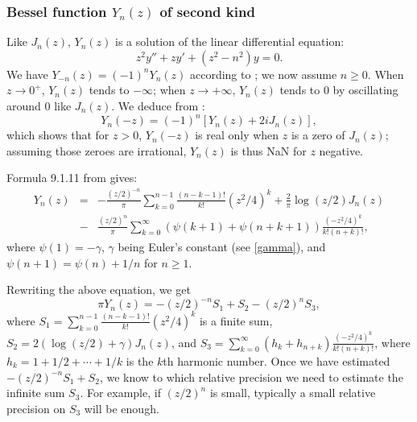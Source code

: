 \documentclass[12pt]{amsart}
\begin{document}
\subsubsection{Bessel function $Y_n(z)$ of second kind}

Like $J_n(z)$, $Y_n(z)$ is a solution of the linear differential equation:
\[ z^2 y'' + z y' + (z^2-n^2) y = 0. \]
We have $Y_{-n}(z) = (-1)^n Y_n(z)$ according to \cite[Eq.~(9.1.5)]{AbSt73};
we now assume $n \geq 0$.
When $z \rightarrow 0^+$, $Y_n(z)$ tends to $-\infty$; when $z \rightarrow
+\infty$, $Y_n(z)$ tends to $0$ by oscillating around $0$ like $J_n(z)$.
We deduce from \cite[Eq.~(9.23)]{Temme96}:
\[ Y_n(-z) = (-1)^n [Y_n(z) + 2 i J_n(z)], \]
which shows that for $z > 0$, $Y_n(-z)$ is real only when $z$ is a zero of
$J_n(z)$; assuming those zeroes are irrational, $Y_n(z)$ is thus NaN for
$z$ negative.

Formula 9.1.11 from \cite{AbSt73} gives:
\begin{eqnarray*}
Y_n(z) &=& -\frac{(z/2)^{-n}}{\pi} \sum_{k=0}^{n-1} \frac{(n-k-1)!}{k!}
   (z^2/4)^k + \frac{2}{\pi} \log(z/2) J_n(z) \\ &-& \frac{(z/2)^n}{\pi}
  \sum_{k=0}^{\infty} (\psi(k+1) + \psi(n+k+1)) \frac{(-z^2/4)^k}{k! (n+k)!},
\end{eqnarray*}
where $\psi(1)=-\gamma$, $\gamma$ being Euler's constant (see
\textsection\ref{gamma}), and $\psi(n+1) = \psi(n) + 1/n$ for $n \geq 1$.

Rewriting the above equation, we get
\[ \pi Y_n(z) = -(z/2)^{-n} S_1 + S_2 - (z/2)^n S_3, \]
where $S_1 = \sum_{k=0}^{n-1} \frac{(n-k-1)!}{k!} (z^2/4)^k$ is
a finite sum,
$S_2 = 2 (\log(z/2) + \gamma) J_n(z)$, and
$S_3 = \sum_{k=0}^{\infty} (h_k + h_{n+k}) \frac{(-z^2/4)^k}{k! (n+k)!}$,
where $h_k = 1 + 1/2 + \cdots + 1/k$ is the $k$th harmonic number.
Once we have estimated $-(z/2)^{-n} S_1 + S_2$, we know to which relative
precision we need to estimate the infinite sum $S_3$. For example, if
$(z/2)^n$ is small, typically a small relative precision on $S_3$ will be
enough.
\end{document}
